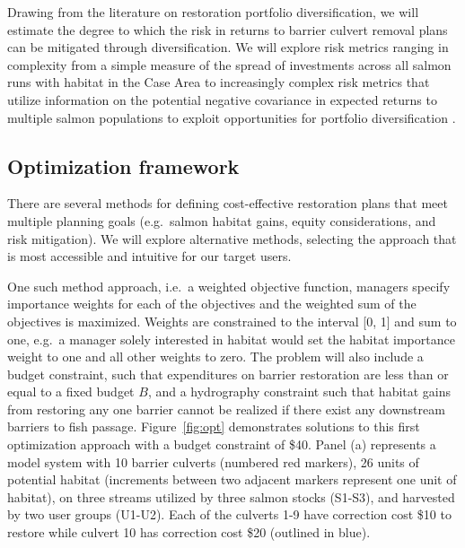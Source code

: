 \documentclass[12pt]{elsarticle}
\begin{document}
Drawing from the literature on restoration portfolio diversification, we will estimate the degree to which the risk in returns to barrier culvert removal plans can be mitigated through diversification. We will explore risk metrics ranging in complexity from a simple measure of the spread of investments across all salmon runs with habitat in the Case Area to increasingly complex risk metrics that utilize information on the potential negative covariance in expected returns to multiple salmon populations to exploit opportunities for portfolio diversification \citep{sanchirico_empirical_2008, jardine_fishermen_2015, johnston_combining_2002}.  




\subsection*{Optimization framework \label{sec:opt}}

There are several methods for defining cost-effective restoration plans that meet multiple planning goals (e.g.\ salmon habitat gains, equity considerations, and risk mitigation). We will explore alternative methods, selecting the approach that is most accessible and intuitive for our target users. 


One such method approach, i.e.\ a weighted objective function, managers specify importance weights for each of the objectives and the weighted sum of the objectives is maximized. Weights are constrained to the interval [0, 1] and sum to one, e.g.\ a manager solely interested in habitat would set the habitat importance weight to one and all other weights to zero. The problem will also include a budget constraint, such that expenditures on barrier restoration are less than or equal to a fixed budget $B$, and a hydrography constraint such that habitat gains from restoring any one barrier cannot be realized if there exist any downstream barriers to fish passage. Figure~\ref{fig:opt} demonstrates solutions to this first optimization approach with a budget constraint of \$40. Panel (a) represents a model system with 10 barrier culverts (numbered red markers), 26 units of potential habitat (increments between two adjacent markers represent one unit of habitat), on three streams utilized by three salmon stocks (S1-S3), and harvested by two user groups (U1-U2). Each of the culverts 1-9 have correction cost \$10 to restore while culvert 10 has correction cost \$20 (outlined in blue).
\end{document}
